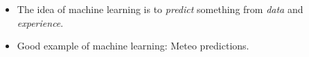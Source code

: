 \documentclass[9pt]{beamer}
\begin{document}
\begin{frame}
  \begin{itemize}
  \item The idea of machine learning is to \emph{predict} something
    from \emph{data} and \emph{experience}.
  \item Good example of machine learning: Meteo predictions.
  \end{itemize}
\end{frame}
\end{document}
